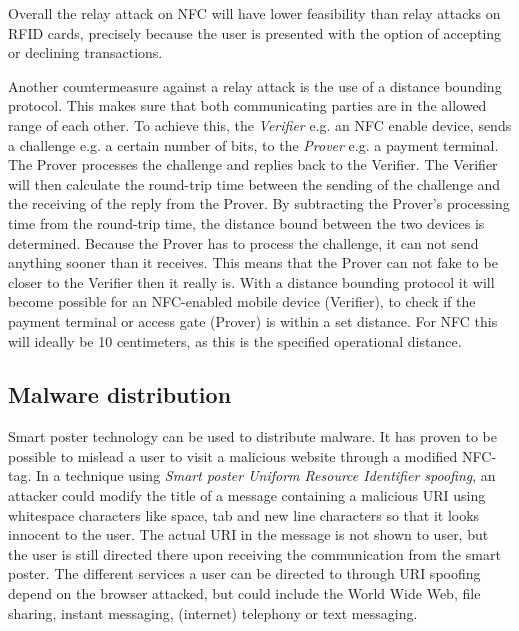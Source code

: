 Overall the relay attack on NFC will have lower feasibility than relay attacks on RFID cards, precisely because the user is presented with the option of accepting or declining transactions.

Another countermeasure against a relay attack is the use of a distance bounding protocol. This makes sure that both communicating parties are in the allowed range of each other. To achieve this, the \textit{Verifier} e.g. an NFC enable device, sends a challenge e.g. a certain number of bits, to the \textit{Prover} e.g. a payment terminal. The Prover processes the challenge and replies back to the Verifier. The Verifier will then calculate the round-trip time between the sending of the challenge and the receiving of the reply from the Prover. By subtracting the Prover's processing time from the round-trip time, the distance bound between the two devices is determined. 
Because the Prover has to process the challenge, it can not send anything sooner than it receives. This means that the Prover can not fake to be closer to the Verifier then it really is.
With a distance bounding protocol it will become possible for an NFC-enabled mobile device (Verifier), to check if the payment terminal or access gate (Prover) is within a set distance.
For NFC this will ideally be 10 centimeters, as this is the specified operational distance. \cite{rasmussenrealization,brands1994distance}



\subsection{Malware distribution}
Smart poster technology can be used to distribute malware.
It has proven to be possible to mislead a user to visit a malicious website through a modified NFC-tag.
In a technique using \textit{Smart poster Uniform Resource Identifier spoofing}, an attacker could modify the title of a message containing a malicious URI using whitespace characters like space, tab and new line characters so that it looks innocent to the user.
The actual URI in the message is not shown to user, but the user is still directed there upon receiving the communication from the smart poster.
The different services a user can be directed to through URI spoofing depend on the browser attacked, but could include the World Wide Web, file sharing, instant messaging, (internet) telephony or text messaging.

